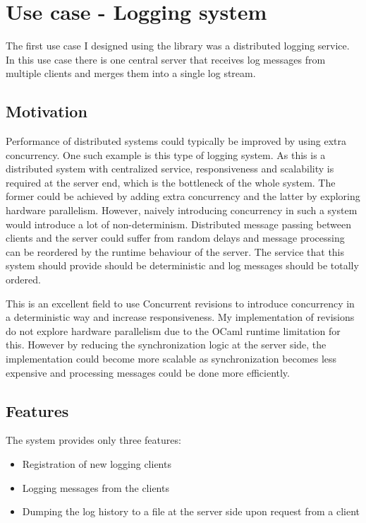 \documentclass[12pt,twoside,notitlepage]{report}
\begin{document}
{{\section{Use case - Logging system}
\label{logging} 
The first use case I designed using the library was a distributed logging service. In this use case there is one central server that receives log messages from multiple clients and merges them into a single log stream. 

\subsection{Motivation}
Performance of distributed systems could typically be improved by using extra concurrency. One such example is this type of logging system. 
As this is a distributed system with centralized service, responsiveness and scalability is required at the server end, which is the bottleneck of the whole system. The former could be achieved by adding extra concurrency and the latter by exploring hardware parallelism. However, naively introducing concurrency in such a system would introduce a lot of non-determinism. Distributed message passing between clients and the server could suffer from random delays and message processing can be reordered by the runtime behaviour of the server. The service that this system should provide should be deterministic and log messages should be totally ordered.

This is an excellent field to use Concurrent revisions to introduce concurrency in a deterministic way and increase responsiveness. My implementation of revisions do not explore hardware parallelism due to the OCaml runtime limitation for this. However by reducing the synchronization logic at the server side, the implementation could become more scalable as synchronization becomes less expensive and processing messages could be done more efficiently.

\subsection{Features}
The system provides only three features:
\begin{itemize}
\item
Registration of new logging clients
\item
Logging messages from the clients
\item
Dumping the log history to a file at the server side upon request from a client
\end{itemize}

}}
\end{document}
